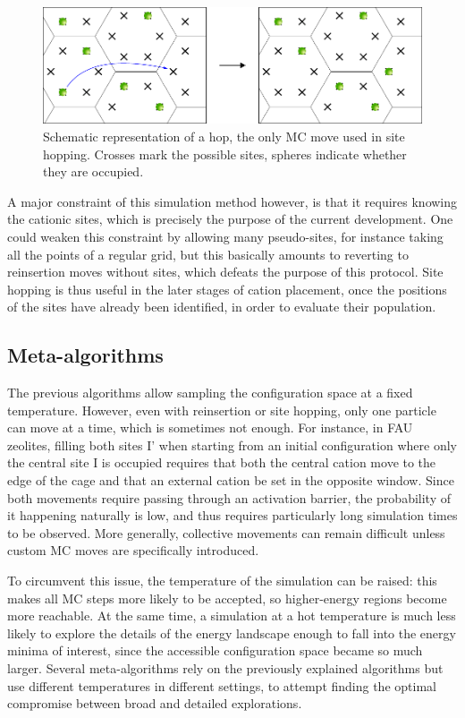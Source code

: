 \documentclass[main.tex]{subfiles}
\begin{document}
\begin{figure}
	\centering
	\includegraphics[width=\linewidth]{figures/cations/sitehopping.pdf}
	\caption{Schematic representation of a hop, the only MC move used in site hopping. Crosses mark the possible sites, spheres indicate whether they are occupied.}\label{fig:sitehopping}
\end{figure}

A major constraint of this simulation method however, is that it requires knowing the cationic sites, which is precisely the purpose of the current development. One could weaken this constraint by allowing many pseudo-sites, for instance taking all the points of a regular grid, but this basically amounts to reverting to reinsertion moves without sites, which defeats the purpose of this protocol. Site hopping is thus useful in the later stages of cation placement, once the positions of the sites have already been identified, in order to evaluate their population.


\subsection{Meta-algorithms}

The previous algorithms allow sampling the configuration space at a fixed temperature. However, even with reinsertion or site hopping, only one particle can move at a time, which is sometimes not enough. For instance, in FAU zeolites, filling both sites I' when starting from an initial configuration where only the central site I is occupied requires that both the central cation move to the edge of the cage and that an external cation be set in the opposite window. Since both movements require passing through an activation barrier, the probability of it happening naturally is low, and thus requires particularly long simulation times to be observed. More generally, collective movements can remain difficult unless custom MC moves are specifically introduced.

To circumvent this issue, the temperature of the simulation can be raised: this makes all MC steps more likely to be accepted, so higher-energy regions become more reachable. At the same time, a simulation at a hot temperature is much less likely to explore the details of the energy landscape enough to fall into the energy minima of interest, since the accessible configuration space became so much larger. Several meta-algorithms rely on the previously explained algorithms but use different temperatures in different settings, to attempt finding the optimal compromise between broad and detailed explorations.
\end{document}
